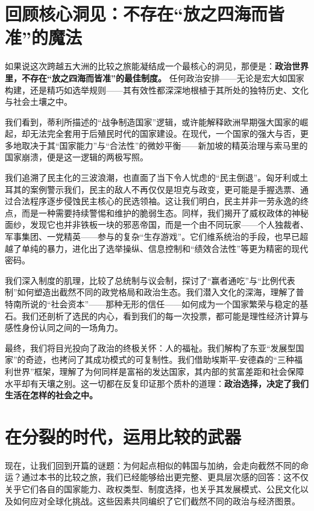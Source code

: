 \documentclass[a5paper, 11pt, openany]{ctexbook}
\begin{document}
\section*{回顾核心洞见：不存在“放之四海而皆准”的魔法}

如果说这次跨越五大洲的比较之旅能凝结成一个最核心的洞见，那便是：\textbf{政治世界里，不存在“放之四海而皆准”的最佳制度。} 任何政治安排——无论是宏大如国家构建，还是精巧如选举规则——其有效性都深深地根植于其所处的独特历史、文化与社会土壤之中。

我们看到，蒂利所描述的“战争制造国家”逻辑，或许能解释欧洲早期强大国家的崛起，却无法完全套用于后殖民时代的国家建设。在现代，一个国家的强大与否，更多地取决于其“国家能力”与“合法性”的微妙平衡——新加坡的精英治理与索马里的国家崩溃，便是这一逻辑的两极写照。

我们追溯了民主化的三波浪潮，也直面了当下令人忧虑的“民主倒退”。匈牙利或土耳其的案例警示我们，民主的敌人不再仅仅是坦克与政变，更可能是手握选票、通过合法程序逐步侵蚀民主核心的民选领袖。这让我们明白，民主并非一劳永逸的终点，而是一种需要持续警惕和维护的脆弱生态。同样，我们揭开了威权政体的神秘面纱，发现它也并非铁板一块的邪恶帝国，而是一个由不同玩家——个人独裁者、军事集团、一党精英——参与的复杂“生存游戏”。它们维系统治的手段，也早已超越了单纯的暴力，进化出了选举操纵、信息控制和“绩效合法性”等更为精密的现代密码。

我们深入制度的肌理，比较了总统制与议会制，探讨了“赢者通吃”与“比例代表制”如何塑造出截然不同的政党格局和政治生态。我们潜入文化的深海，理解了普特南所说的“社会资本”——那种无形的信任——如何成为一个国家繁荣与稳定的基石。我们还剖析了选民的内心，看到我们的每一次投票，都可能是理性经济计算与感性身份认同之间的一场角力。

最终，我们将目光投向了政治的终极关怀：人的福祉。我们解构了东亚“发展型国家”的奇迹，也拷问了其成功模式的可复制性。我们借助埃斯平-安德森的“三种福利世界”框架，理解了为何同样是富裕的发达国家，其内部的贫富差距和社会保障水平却有天壤之别。这一切都在反复印证那个质朴的道理：\textbf{政治选择，决定了我们生活在怎样的社会之中。}

\section*{在分裂的时代，运用比较的武器}

现在，让我们回到开篇的谜题：为何起点相似的韩国与加纳，会走向截然不同的命运？通过本书的比较之旅，我们已经能够给出更完整、更具层次感的回答：这不仅关乎它们各自的国家能力、政权类型、制度选择，也关乎其发展模式、公民文化以及如何应对全球化挑战。这些因素共同编织了它们截然不同的政治与经济图景。
\end{document}
